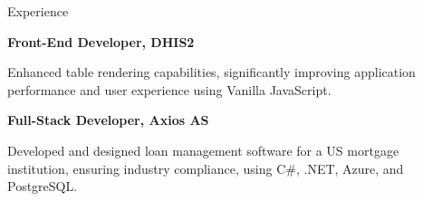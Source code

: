 \begin{rubric}{Experience}
\begin{compactitem}
\vspace{-12pt}
\end{compactitem}
%
\entry*[2017 -- 2018]%
\textbf{Front-End Developer, DHIS2} \par
\begin{compactitem}
\item Enhanced table rendering capabilities, significantly improving application performance and user experience using Vanilla JavaScript.
\vspace{-12pt}
\end{compactitem}
%
\entry*[2014 -- 2016]%
\textbf{Full-Stack Developer, Axios AS} \par
\begin{compactitem}
\item Developed and designed loan management software for a US mortgage institution, ensuring industry compliance, using C\#, .NET, Azure, and PostgreSQL.
\vspace{-12pt}
\end{compactitem}
%
\end{rubric}